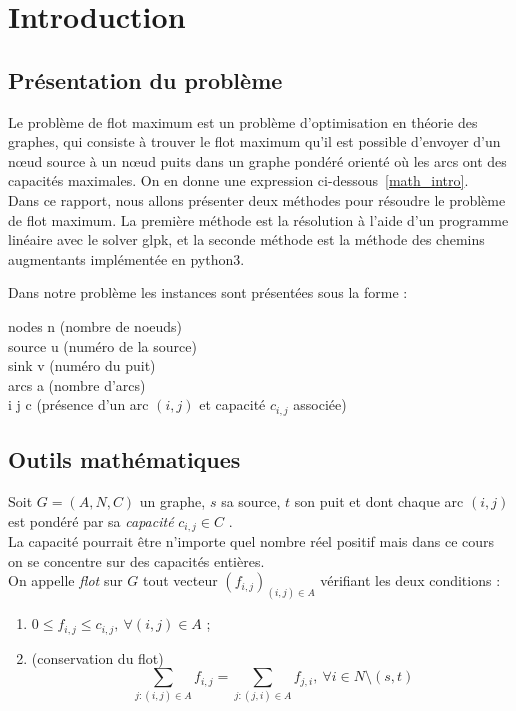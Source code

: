 \documentclass{article}[12pt]
\begin{document}
\tableofcontents
 
 \newpage

\section{Introduction}

\subsection{Présentation du problème}
    Le problème de flot maximum est un problème d'optimisation en théorie des graphes, qui consiste à trouver le flot maximum qu'il est possible d'envoyer d'un nœud source à un nœud puits dans un graphe pondéré orienté où les arcs ont des capacités maximales. On en donne une expression ci-dessous \ref{math_intro}.\\
    
    Dans ce rapport, nous allons présenter deux méthodes pour résoudre le problème de flot maximum.
    La première méthode est la résolution à l'aide d'un programme linéaire avec le solver glpk, et la seconde méthode est la méthode des chemins augmentants implémentée en python3.
    
    Dans notre problème les instances sont présentées sous la forme : \\
	\begin{lslisting} %
		nodes n (nombre de noeuds)\\
		source u (numéro de la source)\\
		sink v (numéro du puit)\\
		arcs a (nombre d’arcs)\\
		i j c (présence d’un arc $(i,j)$ et capacité $c_{i,j}$ associée)
		
	\end{lslisting}
\subsection{Outils mathématiques \label{math_intro}}

    Soit $G = (A,N,C)$ un graphe, $s$ sa source, $t$ son puit et dont chaque arc $(i,j)$ est pondéré par sa {\it capacité} $c_{i,j} \in C$ .\\ 
    La capacité pourrait être n'importe quel nombre réel positif mais dans ce cours on se concentre sur des capacités entières.\\
       
    On appelle {\it flot} sur $G$ tout vecteur $(f_{i,j})_{(i,j) \in A}$ vérifiant les deux conditions : \\
    \begin{enumerate}[label=\roman*)]
    	\item $0 \leq f_{i,j} \leq c_{i,j}, ~ \forall (i,j) \in A$ ; \\
	\item  (conservation du flot) $$ ~ \sum_{j : (i,j) \in A} f_{i,j} = \sum_{j : (j,i) \in A} f_{j,i}, ~ \forall i \in N \setminus {(s,t)}$$ \\
    \end{enumerate}
    
\end{document}

